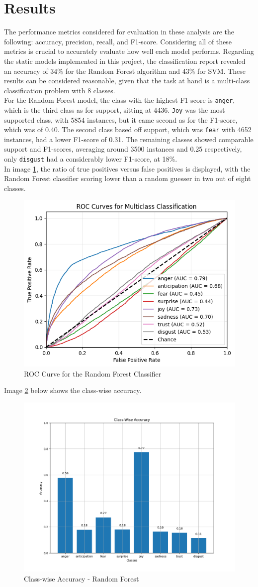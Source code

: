 \chapter*{Results}
\label{ch:results}
The performance metrics considered for evaluation in these analysis are the
following: accuracy, precision, recall, and F1-score. Considering all of these
metrics is crucial to accurately evaluate how well each model performs.
Regarding the static models implemented in this project, the classification
report revealed an accuracy of 34\% for the Random Forest algorithm and 43\% for
SVM. These results can be considered reasonable, given that the task at hand
is a multi-class classification problem with 8 classes.\\

For the Random Forest model, the class with the highest F1-score is \texttt{anger},
which is the third class as for support, sitting at 4436. 
\texttt{Joy} was the most supported class, with 5854 instances, but it came second
as for the F1-score, which was of 0.40. The second class based off support, which
was \texttt{fear} with 4652 instances, had a lower F1-score of 0.31. 
The remaining classes showed comparable support and F1-scores, averaging around
3500 instances and 0.25 respectively, only \texttt{disgust} had a considerably
lower F1-score, at 18\%. \\
In image \ref{fig:roc_rf}, the ratio of true positives versus false positives is
displayed, with the Random Forest classifier scoring lower than a random guesser in
two out of eight classes. \\
\begin{figure}[H]
    \centering
    \includegraphics[width=0.5\linewidth]{pictures/roc_rf.png}
    \caption{ROC Curve for the Random Forest Classifier}
    \label{fig:roc_rf}
\end{figure}
Image \ref{fig:class_acc} below shows the class-wise accuracy. \\
\begin{figure}[H]
    \centering
    \includegraphics[width=0.5\linewidth]{pictures/class_accuracy.png}
    \caption{Class-wise Accuracy - Random Forest}
    \label{fig:class_acc}
\end{figure}

